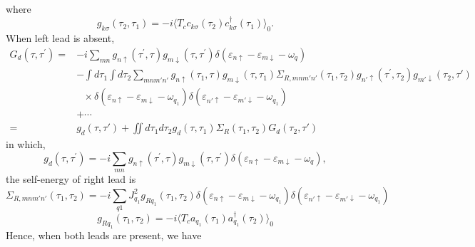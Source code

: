 \documentclass[11pt,a4paper]{article}
\begin{document}
where
\begin{equation}
g_{k\sigma}(\tau_{2}, \tau_{1}) = -i\langle T_{c}c_{k\sigma}(\tau_{2}) c_{k\sigma}^{\dag}(\tau_{1})\rangle_{0}.
\label{eq:left-self-energy}
\end{equation}
When left lead is absent,
\begin{equation}
\begin{split}
G_{d}\left(\tau, \tau^{\prime}\right) =&-i\sum_{mn} g_{n \uparrow}\left(\tau^{\prime}, \tau\right) g_{m \downarrow}\left(\tau, \tau^{\prime}\right) \delta(\varepsilon_{n\uparrow} - \varepsilon_{m\downarrow} - \omega_{q})\\
&-\int d\tau_{1}\int d\tau_{2} \sum_{mnm'n'}g_{n \uparrow}\left(\tau_{1}, \tau\right) g_{m \downarrow}\left(\tau, \tau_{1}\right) \Sigma_{R,mnm'n' }\left(\tau_{1}, \tau_{2}\right) g_{n'\uparrow}\left(\tau^{\prime}, \tau_{2}\right)g_{m'\downarrow}(\tau_{2}, \tau') \\
&~~~\times \delta(\varepsilon_{n\uparrow} - \varepsilon_{m\downarrow} - \omega_{q_{1}})\delta(\varepsilon_{n'\uparrow} - \varepsilon_{m'\downarrow} - \omega_{q_{1}})\\
& + \cdots \\
=& g_{d}(\tau, \tau') + \iint d\tau_{1}d\tau_{2}g_{d}(\tau, \tau_{1}) \Sigma_{R}(\tau_{1}, \tau_{2}) G_{d}(\tau_{2}, \tau')
\end{split}
\end{equation}
in which, 
\begin{equation}
g_{d}\left(\tau, \tau^{\prime}\right) = -i\sum_{mn} g_{n \uparrow}\left(\tau^{\prime}, \tau\right) g_{m \downarrow}\left(\tau, \tau^{\prime}\right) \delta(\varepsilon_{n\uparrow} - \varepsilon_{m\downarrow} - \omega_{q}),
\end{equation}
the self-energy of right lead is
\begin{equation}
\Sigma_{R,mnm'n'}(\tau_{1}, \tau_{2}) = -i\sum_{q1}J_{q_{1}}^{2} g_{Rq_{1}}(\tau_{1}, \tau_{2}) \delta(\varepsilon_{n\uparrow} - \varepsilon_{m\downarrow} - \omega_{q_{1}})\delta(\varepsilon_{n'\uparrow} - \varepsilon_{m'\downarrow} - \omega_{q_{1}})
\end{equation}
\begin{equation}
g_{Rq_{1}}(\tau_{1}, \tau_{2}) = -i\langle T_{c}a_{q_{1}}(\tau_{1}) a_{q_{1}}^{\dag}(\tau_{2})\rangle_{0}
\end{equation}
Hence, when both leads are present, we have
\end{document}
